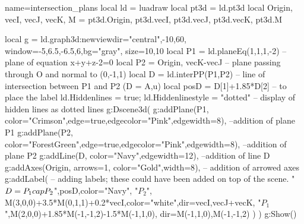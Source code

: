 \begin{luadraw}{name=intersection_plans}
local ld = luadraw
local pt3d = ld.pt3d
local Origin, vecI, vecJ, vecK, M = pt3d.Origin, pt3d.vecI, pt3d.vecJ, pt3d.vecK, pt3d.M

local g = ld.graph3d:new{viewdir={"central",-10,60}, window={-5,6.5,-6.5,6},bg="gray", size={10,10}}
local P1 = ld.planeEq(1,1,1,-2) -- plane of equation x+y+z-2=0
local P2 = {Origin, vecK-vecJ} -- plane passing through O and normal to (0,-1,1)
local D = ld.interPP(P1,P2) -- line of intersection between P1 and P2 (D = {A,u})
local posD = D[1]+1.85*D[2] -- to place the label
ld.Hiddenlines = true; ld.Hiddenlinestyle = "dotted" -- display of hidden lines as dotted lines
g:Dscene3d(
    g:addPlane(P1, {color="Crimson",edge=true,edgecolor="Pink",edgewidth=8}), --addition of plane P1
    g:addPlane(P2, {color="ForestGreen",edge=true,edgecolor="Pink",edgewidth=8}), --addition of plane P2
    g:addLine(D, {color="Navy",edgewidth=12}), --addition of line D
    g:addAxes(Origin, {arrows=1, color="Gold",width=8}), -- addition of arrowed axes
    g:addLabel( -- adding labels; these could have been added on top of the scene.
        "$D=P_1\\cap P_2$",posD,{color="Navy"},
        "$P_2$", M(3,0,0)+3.5*M(0,1,1)+0.2*vecI,{color="white",dir={vecI,vecJ+vecK}},
        "$P_1$",M(2,0,0)+1.85*M(-1,-1,2)-1.5*M(-1,1,0), {dir={M(-1,1,0),M(-1,-1,2)}} )
)
g:Show()
\end{luadraw}
